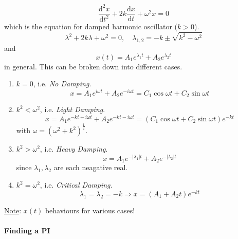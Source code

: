 \documentclass[12pt]{report}
\theoremstyle{definition}
\begin{document}
\begin{ex}
    \[
        \frac{\mathrm{d}^{2}x}{\mathrm{d}t^{2}} + 2k\frac{\mathrm{d}x}{\mathrm{d}t} + \omega^{2}x = 0
    \]
    which is the equation for damped harmonic oscillator ($k > 0$).\[
        \lambda^{2} + 2k\lambda + \omega^{2} = 0, \quad
        \lambda_{1, 2} = -k \pm \sqrt{k^{2} - \omega^{2}}
    \]
    and \[
        x(t) = A_1 e^{\lambda_1 t} + A_2 e^{\lambda_2 t}
    \] in general. This can be broken down into different cases.
    \begin{enumerate}[label = (\arabic*)]
        \item $k = 0$, i.e. \emph{No Damping}.\[
            x = A_1 e^{i\omega t} + A_2 e^{-i\omega t}
            = C_1 \cos{\omega t} + C_2 \sin{\omega t}
        \]

    \item $k^{2} < \omega^{2}$, i.e. \emph{Light Damping}.\[
        x = A_1 e^{-kt + i\omega t} + A_2 e^{-kt - i\omega t}
        = (C_1 \cos{\omega t} + C_2 \sin{\omega t}) e^{-kt}
    \]with $\omega = {(\omega^{2} + k^{2})}^{\frac{1}{2}}$.

\item $k^{2} > \omega^{2}$, i.e. \emph{Heavy Damping}.\[
    x = A_1 e^{-|\lambda_1|t} + A_2 e^{-|\lambda_2|t}
\]
since $\lambda_1, \lambda_2$ are each neagative real.

\item $k^{2} = \omega^{2}$, i.e. \emph{Critical Damping}.\[
        \lambda_1 = \lambda_2 = -k \Rightarrow x = (A_1 + A_2 t)e^{-kt}
\]
    \end{enumerate}
    \underline{Note}: $x(t)$ behaviours for various cases!
\end{ex}

\paragraph{Finding a PI}
\end{document}
